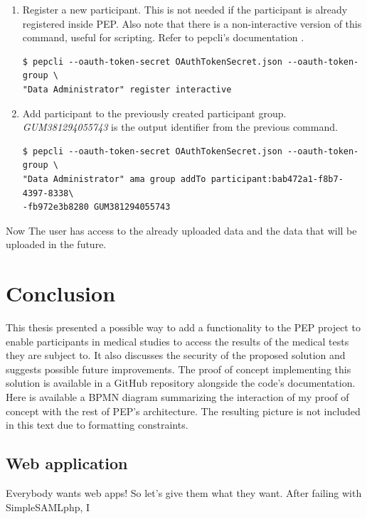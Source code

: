\documentclass{report}
\begin{document}
\begin{enumerate}
\item Register a new participant. This is not needed if the participant is already registered inside PEP. Also note that there is a non-interactive version of this command, useful
		for scripting. Refer to pepcli's documentation \cite{pepcli}.
\begin{verbatim}
$ pepcli --oauth-token-secret OAuthTokenSecret.json --oauth-token-group \
"Data Administrator" register interactive
\end{verbatim}

\item Add participant to the previously created participant group. \textit{GUM381294055743} is the output identifier from the previous command.
\begin{verbatim}
$ pepcli --oauth-token-secret OAuthTokenSecret.json --oauth-token-group \
"Data Administrator" ama group addTo participant:bab472a1-f8b7-4397-8338\
-fb972e3b8280 GUM381294055743
\end{verbatim}

\end{enumerate}

Now The user has access to the already uploaded data and the data that will be uploaded in the future.



\section{Conclusion}
This thesis presented a possible way to add a functionality to the PEP project to enable participants in medical studies to access the results of the medical tests they are subject
to. It also discusses the security of the proposed solution and suggests possible future improvements. The proof of concept implementing this solution is available in a GitHub
\cite{thesis-repo} repository alongside the code's documentation. Here \cite{data-access-new-version} is available a BPMN diagram summarizing the interaction of my proof of concept
with the rest of PEP's architecture. The resulting picture is not included in this text due to formatting constraints.

\iffalse

\subsection{Web application}
Everybody wants web apps! So let's give them what they want. After failing with SimpleSAMLphp, I 
\end{document}

